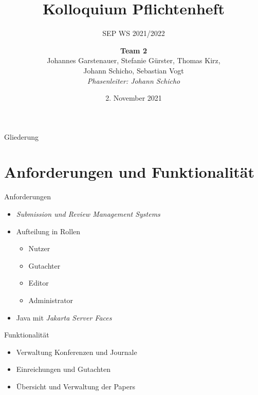 \documentclass{beamer}
\title{Kolloquium Pflichtenheft}
\subtitle{SEP WS 2021/2022}
\date{\small 2. November 2021}
\author{\textbf{Team 2} \\ \small {Johannes Garstenauer, Stefanie Gürster, Thomas Kirz,\\ Johann Schicho, Sebastian Vogt} \\ \vspace{0.5cm}\emph{Phasenleiter: Johann Schicho}\normalsize}
\begin{document}
	\begin{frame}
		\titlepage
	\end{frame}

	\begin{frame}{Gliederung}
		\tableofcontents
	\end{frame}

\section{Anforderungen und Funktionalität}

\begin{frame}{Anforderungen}
	\begin{itemize}
		\item \emph{Submission und Review Management Systems}
		\pause %

		\item Aufteilung in Rollen
		\begin{itemize}
			\item Nutzer
			\item Gutachter
			\item Editor
			\item Administrator
		\end{itemize}
		\pause

		\item Java mit \emph{Jakarta Server Faces}

	\end{itemize}
\end{frame}

\begin{frame}{Funktionalität}
	\begin{itemize}
		\item Verwaltung Konferenzen und Journale
		\pause
		\item Einreichungen und Gutachten
		\pause
		\item Übersicht und Verwaltung der Papers
	\end{itemize}
\end{frame}
\end{document}
